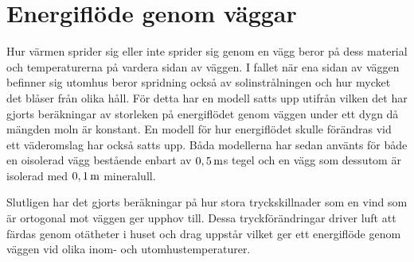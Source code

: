 \section{Energiflöde genom väggar}

Hur värmen sprider sig eller inte sprider sig genom en vägg beror på dess material och temperaturerna på vardera sidan av väggen. I fallet när ena sidan av väggen befinner sig utomhus beror spridning också av solinstrålningen och hur mycket det blåser från olika håll. För detta har en modell satts upp utifrån vilken det har gjorts beräkningar av storleken på energiflödet genom väggen under ett dygn då mängden moln är konstant. En modell för hur energiflödet skulle förändras vid ett väderomslag har också satts upp. Båda modellerna har sedan använts för både en oisolerad vägg bestående enbart av $\unit[0,5]{m}$s tegel och en vägg som dessutom är isolerad med $\unit[0,1]{m}$ mineralull.

Slutligen har det gjorts beräkningar på hur stora tryckskillnader som en vind som är ortogonal mot väggen ger upphov till. Dessa tryckförändringar driver luft att färdas genom otätheter i huset och drag uppstår vilket ger ett energiflöde genom väggen vid olika inom- och utomhustemperaturer.






